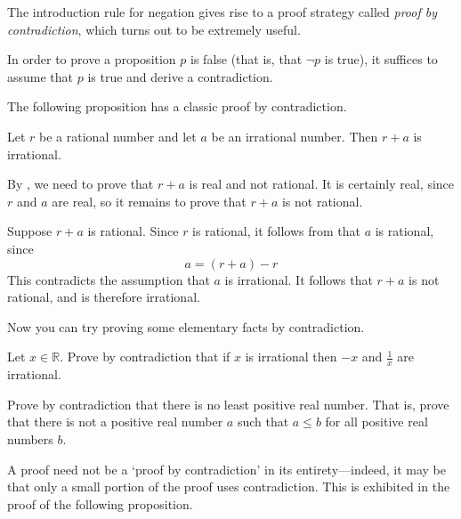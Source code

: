 The introduction rule for negation \introrule{\neg} gives rise to a proof strategy called \textit{proof by contradiction}, which turns out to be extremely useful.

\begin{strategy}
\label{strProvingNegationsDirect}
\label{strProofByContradictionDirect}
In order to prove a proposition $p$ is false (that is, that $\neg p$ is true), it suffices to assume that $p$ is true and derive a contradiction.
\end{strategy}

The following proposition has a classic proof by contradiction.

\begin{proposition}
Let $r$ be a rational number and let $a$ be an irrational number. Then $r+a$ is irrational. 
\end{proposition}

\begin{cproof}
By , we need to prove that $r+a$ is real and not rational. It is certainly real, since $r$ and $a$ are real, so it remains to prove that $r+a$ is not rational.

Suppose $r+a$ is rational. Since $r$ is rational, it follows from  that $a$ is rational, since
\[
a = (r+a) - r
\]
This contradicts the assumption that $a$ is irrational. It follows that $r+a$ is not rational, and is therefore irrational.
\end{cproof}

Now you can try proving some elementary facts by contradiction.

\begin{exercise}
\label{exNegationAndReciprocalOfIrrationalNumbers}
Let $x \in \mathbb{R}$. Prove by contradiction that if $x$ is irrational then $-x$ and $\frac{1}{x}$ are irrational.
\end{exercise}

\begin{exercise}
\label{exNoLeastPositiveReal}
Prove by contradiction that there is no least positive real number. That is, prove that there is not a positive real number $a$ such that $a \le b$ for all positive real numbers $b$.
\end{exercise}

A proof need not be a `proof by contradiction' in its entirety---indeed, it may be that only a small portion of the proof uses contradiction. This is exhibited in the proof of the following proposition.

